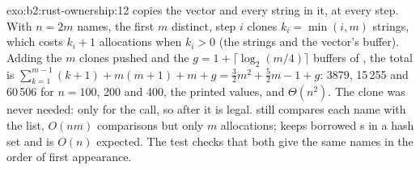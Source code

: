 \begin{solution}{exo:b2:rust-ownership:12}
 copies the vector and every string in it, at every step. With $n = 2m$ names, the first $m$
distinct, step $i$ clones $k_i = \min(i, m)$ strings, which costs $k_i + 1$ allocations when $k_i > 0$ (the strings and
the vector's buffer). Adding the $m$ clones pushed and the $g = 1 + \lceil \log_2 (m / 4) \rceil$ buffers of
, the total is $\sum_{k=1}^{m-1} (k+1) + m(m+1) + m + g = \frac{3}{2}m^2 + \frac{5}{2}m - 1 + g$: 3879,
15\,255 and 60\,506 for $n = 100$, 200 and 400, the printed values, and $\Theta(n^2)$. The clone was never needed:
   only for the call, so  after it is legal.
 still compares each name with the list, $O(nm)$ comparisons but only $m$ allocations;
 keeps borrowed s in a hash set and is $O(n)$ expected. The test checks that both
give the same names in the order of first appearance.
\end{solution}

